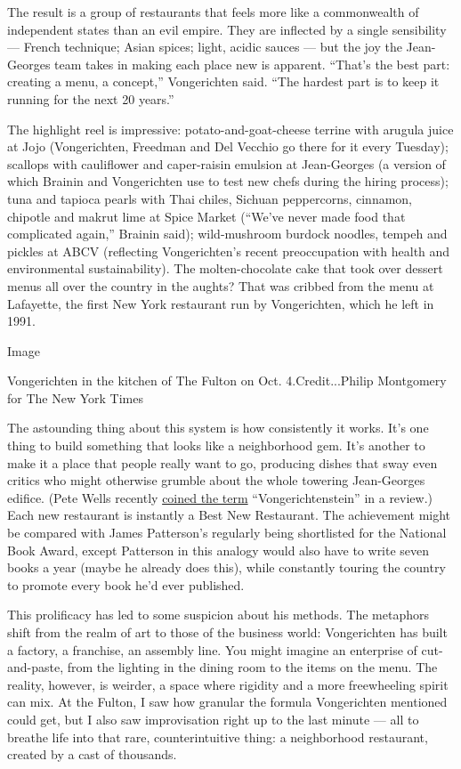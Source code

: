 The result is a group of restaurants that feels more like a commonwealth
of independent states than an evil empire. They are inflected by a
single sensibility --- French technique; Asian spices; light, acidic
sauces --- but the joy the Jean-Georges team takes in making each place
new is apparent. ``That's the best part: creating a menu, a concept,''
Vongerichten said. ``The hardest part is to keep it running for the next
20 years.''

The highlight reel is impressive: potato-and-goat-cheese terrine with
arugula juice at Jojo (Vongerichten, Freedman and Del Vecchio go there
for it every Tuesday); scallops with cauliflower and caper-raisin
emulsion at Jean-Georges (a version of which Brainin and Vongerichten
use to test new chefs during the hiring process); tuna and tapioca
pearls with Thai chiles, Sichuan peppercorns, cinnamon, chipotle and
makrut lime at Spice Market (``We've never made food that complicated
again,'' Brainin said); wild-mushroom burdock noodles, tempeh and
pickles at ABCV (reflecting Vongerichten's recent preoccupation with
health and environmental sustainability). The molten-chocolate cake that
took over dessert menus all over the country in the aughts? That was
cribbed from the menu at Lafayette, the first New York restaurant run by
Vongerichten, which he left in 1991.

Image

Vongerichten in the kitchen of The Fulton on Oct. 4.Credit...Philip
Montgomery for The New York Times

The astounding thing about this system is how consistently it works.
It's one thing to build something that looks like a neighborhood gem.
It's another to make it a place that people really want to go, producing
dishes that sway even critics who might otherwise grumble about the
whole towering Jean-Georges edifice. (Pete Wells recently
\href{https://www.nytimes.com/2019/04/23/dining/wayan-restaurant-review.html}{coined
the term} ``Vongerichtenstein'' in a review.) Each new restaurant is
instantly a Best New Restaurant. The achievement might be compared with
James Patterson's regularly being shortlisted for the National Book
Award, except Patterson in this analogy would also have to write seven
books a year (maybe he already does this), while constantly touring the
country to promote every book he'd ever published.

This prolificacy has led to some suspicion about his methods. The
metaphors shift from the realm of art to those of the business world:
Vongerichten has built a factory, a franchise, an assembly line. You
might imagine an enterprise of cut-and-paste, from the lighting in the
dining room to the items on the menu. The reality, however, is weirder,
a space where rigidity and a more freewheeling spirit can mix. At the
Fulton, I saw how granular the formula Vongerichten mentioned could get,
but I also saw improvisation right up to the last minute --- all to
breathe life into that rare, counterintuitive thing: a neighborhood
restaurant, created by a cast of thousands.

